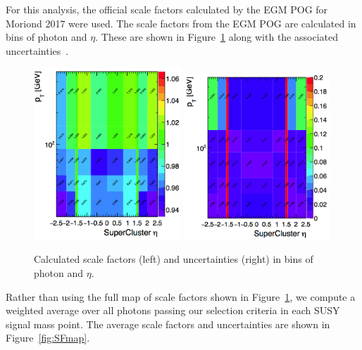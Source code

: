 For this analysis, the official
scale factors calculated by the EGM POG for Moriond 2017 were used.
The scale factors from the EGM POG are calculated in bins of photon \pt and
$\eta$. These are shown in Figure~\ref{fig:SF} along with the
associated uncertainties~\cite{SF_twiki}.

\begin{figure}[htbp]
    \centering
    \includegraphics[width=0.49\textwidth]{Figures/EventSelect/scalefactors.png}
    \includegraphics[width=0.49\textwidth]{Figures/EventSelect/sf_errors.png}
    \caption{Calculated scale factors (left) and uncertainties (right)
      in bins of photon \pt and $\eta$.}
    \label{fig:SF}
\end{figure}

Rather than using the full map of scale factors shown in Figure~\ref{fig:SF},
we compute a weighted average over all photons passing our selection criteria
in each SUSY signal mass point.
The average scale factors and uncertainties are shown in Figure~\ref{fig:SFmap}.

